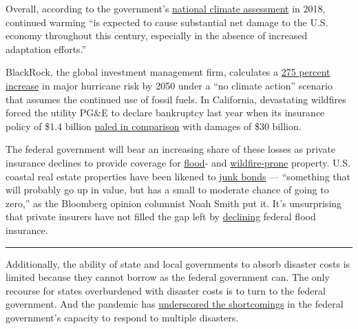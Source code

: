 Overall, according to the government's
\href{https://nca2018.globalchange.gov/}{national climate assessment} in
2018, continued warming ``is expected to cause substantial net damage to
the U.S. economy throughout this century, especially in the absence of
increased adaptation efforts.''

BlackRock, the global investment management firm, calculates a
\href{https://www.blackrock.com/us/individual/literature/whitepaper/bii-physical-climate-risks-april-2019.pdf}{275
percent increase} in major hurricane risk by 2050 under a ``no climate
action'' scenario that assumes the continued use of fossil fuels. In
California, devastating wildfires forced the utility PG\&E to declare
bankruptcy last year when its insurance policy of \$1.4 billion
\href{https://www.forbes.com/sites/christopherhelman/2018/11/15/californias-electric-giant-faces-possible-30-billion-in-damages-for-fires-that-have-killed-more-than-100/\#5079293238c2}{paled
in comparison} with damages of \$30 billion.

The federal government will bear an increasing share of these losses as
private insurance declines to provide coverage for
\href{https://www.nytimes.com/interactive/2020/06/29/climate/hidden-flood-risk-maps.html}{flood}-
and
\href{https://www.wsj.com/articles/no-one-can-agree-on-how-to-price-california-home-insurance-for-wildfires-11568649298}{wildfire-prone}
property. U.S. coastal real estate properties have been likened to
\href{https://nam11.safelinks.protection.outlook.com/?url=https\%3A\%2F\%2Fwww.bloomberg.com\%2Fopinion\%2Farticles\%2F2018-05-03\%2Fflood-risk-makes-coastal-real-estate-look-like-a-junk-bond\%3Fsref\%3D8nb4B7zL\&data=02\%7C01\%7Cnsteel\%40rmi.org\%7Cadec35ab733049a0b57008d816fd9823\%7C8ed8a585d8e64b00b9ccd370783559f6\%7C1\%7C0\%7C637284625728410773\&sdata=mCgVuOl8Z2sg76JVje\%2B100Q5ANUcp2gtGuEpCqupcok\%3D\&reserved=0}{junk
bonds} --- ``something that will probably go up in value, but has a
small to moderate chance of going to zero,'' as the Bloomberg opinion
columnist Noah Smith put it. It's unsurprising that private insurers
have not filled the gap left by
\href{http://www.ouazad.com/resources/paper_kahn_ouazad.pdf}{declining}
federal flood insurance.

\begin{center}\rule{0.5\linewidth}{\linethickness}\end{center}

Additionally, the ability of state and local governments to absorb
disaster costs is limited because they cannot borrow as the federal
government can. The only recourse for states overburdened with disaster
costs is to turn to the federal government. And the pandemic has
\href{https://www.nytimes.com/2020/05/22/climate/fema-volunteer-disaster-response.html}{underscored
the shortcomings} in the federal government's capacity to respond to
multiple disasters.

